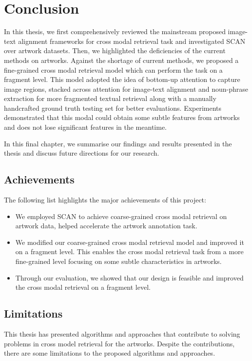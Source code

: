 \chapter{Conclusion}
\label{cha:conclusion}

In this thesis, we first comprehensively reviewed the mainstream proposed image-text alignment frameworks for cross modal retrieval task and investigated SCAN over artwork datasets. Then, we highlighted the deficiencies of the current methods on artworks. Against the shortage of current methods, we proposed a fine-grained cross modal retrieval model which can perform the task on a fragment level. This model adopted the idea of bottom-up attention \cite{bottomup} to capture image regions, stacked across attention \cite{scan} for image-text alignment and noun-phrase extraction for more fragmented textual retrieval along with a manually handcrafted ground truth testing set for better evaluations. Experiments demonstrated that this modal could obtain some subtle features from artworks and does not lose significant features in the meantime. 

In this final chapter, we summarise our findings and results presented in the thesis and discuss future directions for our research.

\section{Achievements}
The following list highlights the major achievements of this project:

\begin{itemize}
    \item We employed SCAN to achieve coarse-grained cross modal retrieval on artwork data, helped accelerate the artwork annotation task.
    \item We modified our coarse-grained cross modal retrieval model and improved it on a fragment level. This enables the cross modal retrieval task from a more fine-grained level focusing on some subtle characteristics in artworks.
    \item Through our evaluation, we showed that our design is feasible and improved the cross modal retrieval on a fragment level.
\end{itemize}


\section{Limitations}
This thesis has presented algorithms and approaches that contribute to solving problems in cross model retrieval for the artworks. Despite the contributions, there are some limitations to the proposed algorithms and approaches.

